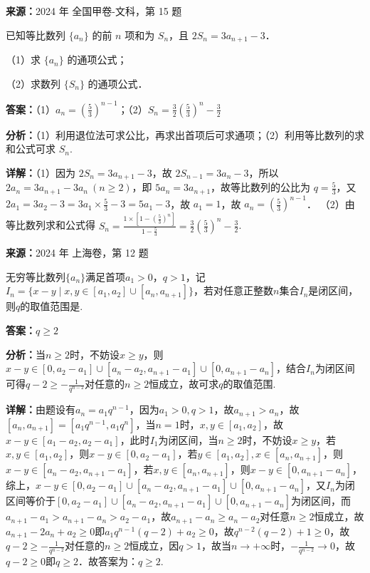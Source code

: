 \begin{question}[points=12]
\textbf{来源：}2024 年 全国甲卷-文科，第 15 题\par
已知等比数列 $\{a_n\}$ 的前 $n$ 项和为 $S_n$，且 $2S_n = 3a_{n+1} - 3$．

（1）求 $\{a_n\}$ 的通项公式；

（2）求数列 $\{S_n\}$ 的通项公式．
\begin{solution}
\textbf{答案：}（1）$a_n = \left(\frac{5}{3}\right)^{n-1}$；（2）$S_n = \frac{3}{2}\left(\frac{5}{3}\right)^n - \frac{3}{2}$

\textbf{分析：}（1）利用退位法可求公比，再求出首项后可求通项；（2）利用等比数列的求和公式可求 $S_n$.

\textbf{详解：}（1）因为 $2S_n = 3a_{n+1} - 3$，故 $2S_{n-1} = 3a_n - 3$，所以 $2a_n = 3a_{n+1} - 3a_n\ (n \ge 2)$，即 $5a_n = 3a_{n+1}$，故等比数列的公比为 $q = \frac{5}{3}$，又 $2a_1 = 3a_2 - 3 = 3a_1 \times \frac{5}{3} - 3 = 5a_1 - 3$，故 $a_1 = 1$，故 $a_n = \left(\frac{5}{3}\right)^{n-1}$．
（2）由等比数列求和公式得 $S_n = \frac{1 \times \left[1 - \left(\frac{5}{3}\right)^n\right]}{1 - \frac{5}{3}} = \frac{3}{2}\left(\frac{5}{3}\right)^n - \frac{3}{2}$.
\end{solution}
\end{question}

\begin{question}[points=5]
\textbf{来源：}2024 年 上海卷，第 12 题\par
无穷等比数列$\{a_n\}$满足首项$a_1>0$，$q>1$，记$I_n=\{x-y\mid x,y\in[a_1,a_2]\cup[a_n,a_{n+1}]\}$，若对任意正整数$n$集合$I_n$是闭区间，则$q$的取值范围是.
\fillin[{$q\ge2$}]
\begin{solution}
\textbf{答案：}$q\ge2$

\textbf{分析：}当$n\ge2$时，不妨设$x\ge y$，则$x-y\in[0,a_2-a_1]\cup[a_n-a_2,a_{n+1}-a_1]\cup[0,a_{n+1}-a_n]$，结合$I_n$为闭区间可得$q-2\ge-\frac{1}{q^{n-2}}$对任意的$n\ge2$恒成立，故可求$q$的取值范围.

\textbf{详解：}由题设有$a_n=a_1q^{n-1}$，因为$a_1>0,q>1$，故$a_{n+1}>a_n$，故$[a_n,a_{n+1}]=[a_1q^{n-1},a_1q^n]$，当$n=1$时，$x,y\in[a_1,a_2]$，故$x-y\in[a_1-a_2,a_2-a_1]$，此时$I_1$为闭区间，当$n\ge2$时，不妨设$x\ge y$，若$x,y\in[a_1,a_2]$，则$x-y\in[0,a_2-a_1]$，若$y\in[a_1,a_2],x\in[a_n,a_{n+1}]$，则$x-y\in[a_n-a_2,a_{n+1}-a_1]$，若$x,y\in[a_n,a_{n+1}]$，则$x-y\in[0,a_{n+1}-a_n]$，综上，$x-y\in[0,a_2-a_1]\cup[a_n-a_2,a_{n+1}-a_1]\cup[0,a_{n+1}-a_n]$，又$I_n$为闭区间等价于$[0,a_2-a_1]\cup[a_n-a_2,a_{n+1}-a_1]\cup[0,a_{n+1}-a_n]$为闭区间，而$a_{n+1}-a_1>a_{n+1}-a_n>a_2-a_1$，故$a_{n+1}-a_n\ge a_n-a_2$对任意$n\ge2$恒成立，故$a_{n+1}-2a_n+a_2\ge0$即$a_1q^{n-1}(q-2)+a_2\ge0$，故$q^{n-2}(q-2)+1\ge0$，故$q-2\ge-\frac{1}{q^{n-2}}$对任意的$n\ge2$恒成立，因$q>1$，故当$n\to+\infty$时，$-\frac{1}{q^{n-2}}\to0$，故$q-2\ge0$即$q\ge2$．故答案为：$q\ge2$.
\end{solution}
\end{question}

